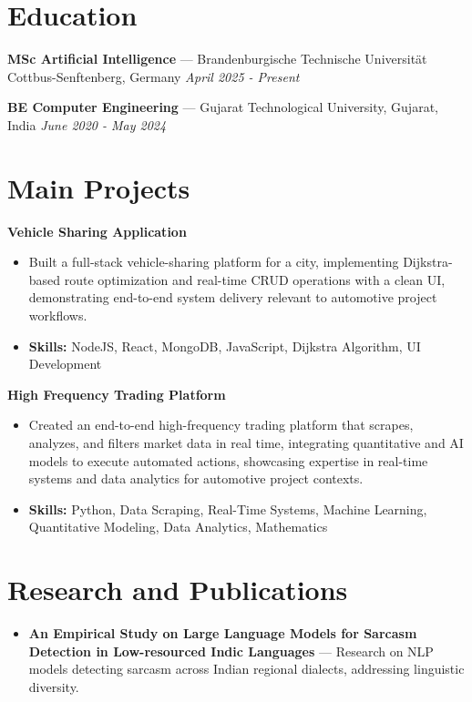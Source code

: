 \documentclass[a4paper,10pt]{article}
\begin{document}
\section*{Education}
\textbf{MSc Artificial Intelligence} — Brandenburgische Technische Universität Cottbus-Senftenberg, Germany \hfill \textit{April 2025 - Present}\par
\vspace{1.5pt}
\textbf{BE Computer Engineering} — Gujarat Technological University, Gujarat, India \hfill \textit{June 2020 - May 2024}\par

\section*{Main Projects}
\textbf{Vehicle Sharing Application}\par
\vspace{1pt}
\begin{itemize}
  \item Built a full-stack vehicle-sharing platform for a city, implementing Dijkstra-based route optimization and real-time CRUD operations with a clean UI, demonstrating end-to-end system delivery relevant to automotive project workflows.
  \item \textbf{Skills:} NodeJS, React, MongoDB, JavaScript, Dijkstra Algorithm, UI Development
\end{itemize}
\vspace{3pt}
\textbf{High Frequency Trading Platform}\par
\vspace{1pt}
\begin{itemize}
  \item Created an end-to-end high-frequency trading platform that scrapes, analyzes, and filters market data in real time, integrating quantitative and AI models to execute automated actions, showcasing expertise in real-time systems and data analytics for automotive project contexts.
  \item \textbf{Skills:} Python, Data Scraping, Real-Time Systems, Machine Learning, Quantitative Modeling, Data Analytics, Mathematics
\end{itemize}

\section*{Research and Publications}
\begin{itemize}
\item \textbf{An Empirical Study on Large Language Models for Sarcasm Detection in Low-resourced Indic Languages} — Research on NLP models detecting sarcasm across Indian regional dialects, addressing linguistic diversity.
\end{itemize}
\end{document}
